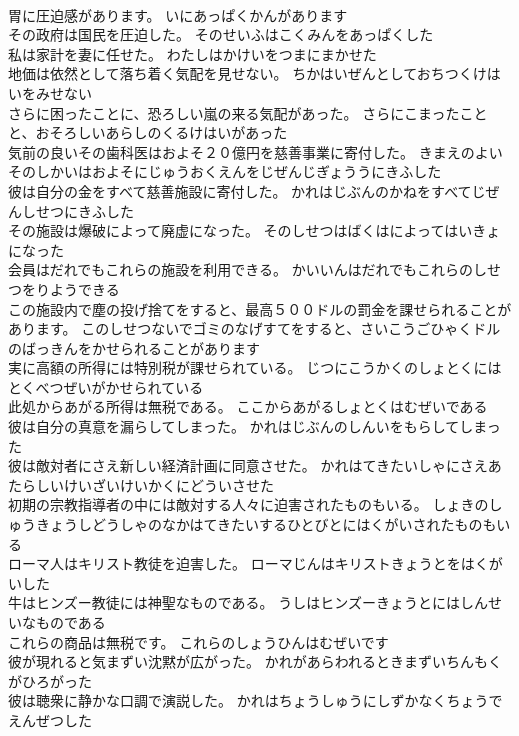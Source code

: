 \documentclass[8pt]{extreport}
\begin{document}
\begin{CJK}{UTF8}{min}
\\	胃に圧迫感があります。	いにあっぱくかんがあります 
\\	その政府は国民を圧迫した。	そのせいふはこくみんをあっぱくした 
\\	私は家計を妻に任せた。	わたしはかけいをつまにまかせた 
\\	地価は依然として落ち着く気配を見せない。	ちかはいぜんとしておちつくけはいをみせない 
\\	さらに困ったことに、恐ろしい嵐の来る気配があった。	さらにこまったことと、おそろしいあらしのくるけはいがあった 
\\	気前の良いその歯科医はおよそ２０億円を慈善事業に寄付した。	きまえのよいそのしかいはおよそにじゅうおくえんをじぜんじぎょううにきふした 
\\	彼は自分の金をすべて慈善施設に寄付した。	かれはじぶんのかねをすべてじぜんしせつにきふした 
\\	その施設は爆破によって廃虚になった。	そのしせつはばくはによってはいきょになった 
\\	会員はだれでもこれらの施設を利用できる。	かいいんはだれでもこれらのしせつをりようできる 
\\	この施設内で塵の投げ捨てをすると、最高５００ドルの罰金を課せられることがあります。	このしせつないでゴミのなげすてをすると、さいこうごひゃくドルのばっきんをかせられることがあります 
\\	実に高額の所得には特別税が課せられている。	じつにこうかくのしょとくにはとくべつぜいがかせられている 
\\	此処からあがる所得は無税である。	ここからあがるしょとくはむぜいである 
\\	彼は自分の真意を漏らしてしまった。	かれはじぶんのしんいをもらしてしまった 
\\	彼は敵対者にさえ新しい経済計画に同意させた。	かれはてきたいしゃにさえあたらしいけいざいけいかくにどういさせた 
\\	初期の宗教指導者の中には敵対する人々に迫害されたものもいる。	しょきのしゅうきょうしどうしゃのなかはてきたいするひとびとにはくがいされたものもいる 
\\	ローマ人はキリスト教徒を迫害した。	ローマじんはキリストきょうとをはくがいした 
\\	牛はヒンズー教徒には神聖なものである。	うしはヒンズーきょうとにはしんせいなものである 
\\	これらの商品は無税です。	これらのしょうひんはむぜいです 
\\	彼が現れると気まずい沈黙が広がった。	かれがあらわれるときまずいちんもくがひろがった 
\\	彼は聴衆に静かな口調で演説した。	かれはちょうしゅうにしずかなくちょうでえんぜつした 

\end{CJK}
\end{document}
